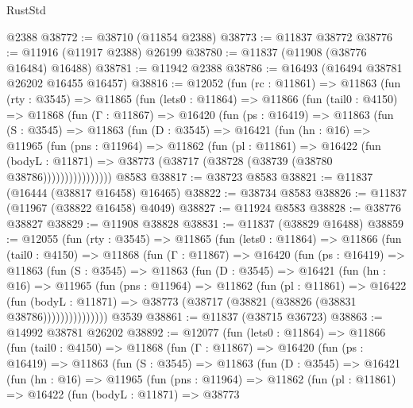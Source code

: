 \begin{lexlean}{RustStd}
\begin{coremodule}
{\begin{coremodule}
{{{{{{{{{{{{{{{{{{{{{{{{{{{{{{{{{{{{{{{{{{{{{{{{{{    @2388
@38772 := @38710 (@11854 @2388)
@38773 := @11837 @38772
@38776 := @11916 (@11917 @2388) @26199
@38780 := @11837 (@11908 (@38776 @16484) @16488)
@38781 := @11942 @2388
@38786 := @16493 (@16494 @38781 @26202 @16455 @16457)
@38816 := @12052
    (fun (rc : @11861) =>
    @11863
      (fun (rty : @3545) =>
      @11865
        (fun (lets0 : @11864) =>
        @11866
          (fun (tail0 : @4150) =>
          @11868
            (fun (Γ : @11867) =>
            @16420
              (fun (ps : @16419) =>
              @11863
                (fun (S : @3545) =>
                @11863
                  (fun (D : @3545) =>
                  @16421
                    (fun (hn : @16) =>
                    @11965
                      (fun (pns : @11964) =>
                      @11862
                        (fun (pl : @11861) =>
                        @16422
                          (fun (bodyL : @11871) =>
                          @38773 (@38717 (@38728 (@38739 (@38780 @38786))))))))))))))))
    @8583
@38817 := @38723 @8583
@38821 := @11837 (@16444 (@38817 @16458) @16465)
@38822 := @38734 @8583
@38826 := @11837 (@11967 (@38822 @16458) @4049)
@38827 := @11924 @8583
@38828 := @38776 @38827
@38829 := @11908 @38828
@38831 := @11837 (@38829 @16488)
@38859 := @12055
    (fun (rty : @3545) =>
    @11865
      (fun (lets0 : @11864) =>
      @11866
        (fun (tail0 : @4150) =>
        @11868
          (fun (Γ : @11867) =>
          @16420
            (fun (ps : @16419) =>
            @11863
              (fun (S : @3545) =>
              @11863
                (fun (D : @3545) =>
                @16421
                  (fun (hn : @16) =>
                  @11965
                    (fun (pns : @11964) =>
                    @11862
                      (fun (pl : @11861) =>
                      @16422
                        (fun (bodyL : @11871) =>
                        @38773 (@38717 (@38821 (@38826 (@38831 @38786)))))))))))))))
    @3539
@38861 := @11837 (@38715 @36723)
@38863 := @14992 @38781 @26202
@38892 := @12077
    (fun (lets0 : @11864) =>
    @11866
      (fun (tail0 : @4150) =>
      @11868
        (fun (Γ : @11867) =>
        @16420
          (fun (ps : @16419) =>
          @11863
            (fun (S : @3545) =>
            @11863
              (fun (D : @3545) =>
              @16421
                (fun (hn : @16) =>
                @11965
                  (fun (pns : @11964) =>
                  @11862
                    (fun (pl : @11861) =>
                    @16422
                      (fun (bodyL : @11871) =>
                      @38773
}}}}}}}}}}}}}}}}}}}}}}}}}}}}}}}}}}}}}}}}}}}}}}}}}}
\end{coremodule}}
\end{coremodule}
\end{lexlean}

